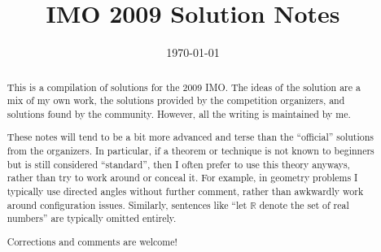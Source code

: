 \documentclass[11pt]{scrartcl}
\title{IMO 2009 Solution Notes}
\date{\today}
\begin{document}
\maketitle

\begin{abstract}
This is a compilation of solutions
for the 2009 IMO.
The ideas of the solution are a mix of my own work,
the solutions provided by the competition organizers,
and solutions found by the community.
However, all the writing is maintained by me.

These notes will tend to be a bit more advanced and terse than the ``official''
solutions from the organizers.
In particular, if a theorem or technique is not known to beginners
but is still considered ``standard'', then I often prefer to
use this theory anyways, rather than try to work around or conceal it.
For example, in geometry problems I typically use directed angles
without further comment, rather than awkwardly work around configuration issues.
Similarly, sentences like ``let $\mathbb{R}$ denote the set of real numbers''
are typically omitted entirely.

Corrections and comments are welcome!
\end{abstract}

\tableofcontents
\newpage

\addtocounter{section}{-1}
\end{document}
